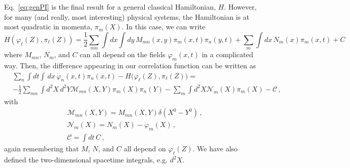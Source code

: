 \documentclass{article}
\numberwithin{equation}{subsection}
\begin{document}
Eq.~\eqref{eq:genPI} is the final result for a general classical Hamiltonian, $H$. However, for many (and really, most interesting) physical systems, the Hamiltonian is at 
most quadratic in momenta, $\pi_m(X)$. In this case, we can write
\begin{equation}
    H(\varphi_\ell(Z),\pi_\ell(Z)) = \frac{1}{2}\sum_{mn}\int dx\int dy\,M_{mn}(x, y)\pi_m(x,t)\pi_n(y,t) + \sum_m \int dx\,N_m(x)\pi_m(x,t) + C
\end{equation}
where $M_{mn}$, $N_m$, and $C$ can all depend on the fields $\varphi_m(x,t)$ in a complicated way. Then, the difference appearing in our correlation function can be written as
\begin{equation}\begin{split}
    &\sum_n\int dt\int\,dx\,\dot{\varphi}_n(x, t)\pi_n(x, t) - H\big(\varphi_\ell(Z),\pi_\ell(Z)\big) = \\[0.5em]
    &-\frac{1}{2}\sum_{mn}\int d^2X\,d^2Y\mathcal{M}_{mn}(X, Y)\pi_m(X)\pi_n(Y) - \sum_m\int d^2X \mathcal{N}_m(X)\pi_m(X) - \mathcal{C}\,,
\end{split}\end{equation}
with
\begin{equation}
    \begin{split}
        &\mathcal{M}_{mn}(X, Y) = M_{mn}(X, Y)\delta(X^0 - Y^0)\,, \\[0.5em]
        &\mathcal{N}_{m}(X) = N_m(X) - \dot{\varphi}_m(X)\,, \\[0.5em]
        &\mathcal{C} = \int dt\,C\,,
    \end{split}
\end{equation}
again remembering that $M$, $N$, and $C$ all depend on $\varphi_\ell(Z)$. We have also defined the two-dimensional spacetime integrals, e.g. $d^2X$.
\end{document}
